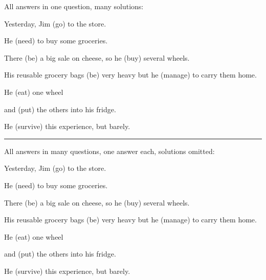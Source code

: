 \documentclass{ximera}
\begin{document}
\begin{question}
\begin{solution}

All answers in one question, many solutions:

Yesterday, Jim  (go) to the store.\end{solution}\begin{solution} He  (need) to buy some groceries.\end{solution}\begin{solution} There  (be) a big sale on cheese, so he  (buy) several wheels.\end{solution}\begin{solution} His reusable grocery bags  (be) very heavy but he  (manage) to carry them home.\end{solution}\begin{solution} He  (eat) one wheel\end{solution}\begin{solution} and  (put) the others into his fridge.\end{solution}\begin{solution} He  (survive) this experience, but barely.

\end{solution}
\end{question}

\rule{1cm}{1pt}

\begin{question}

All answers in many questions, one answer each, solutions omitted:

Yesterday, Jim  (go) to the store.\end{question}\begin{question} He  (need) to buy some groceries.\end{question}\begin{question} There  (be) a big sale on cheese, so he  (buy) several wheels.\end{question}\begin{question} His reusable grocery bags  (be) very heavy but he  (manage) to carry them home.\end{question}\begin{question} He  (eat) one wheel\end{question}\begin{question} and  (put) the others into his fridge.\end{question} \begin{question} He  (survive) this experience, but barely.

\end{question}
\end{document}

